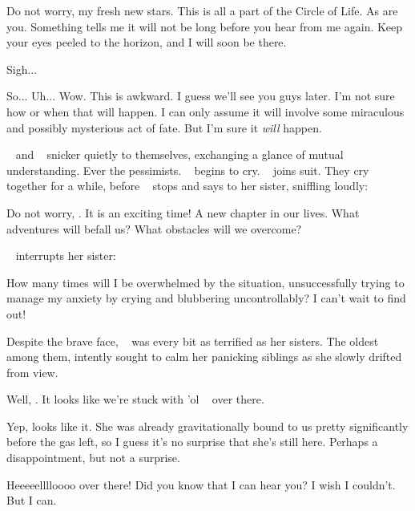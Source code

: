 \documentclass[main.tex]{subfiles}
\begin{document}
\par \Maia Do not worry, my fresh new stars. This is all a part of the Circle of Life.  As are you.  Something tells me it will not be long before you hear from me again. Keep your eyes peeled to the horizon, and I will soon be there.  

\par \Electra Sigh...  

\par \Taygete So... Uh... Wow.  This is awkward.  I guess we'll see you guys later.  I'm not sure how or when that will happen.  I can only assume it will involve some miraculous and possibly mysterious act of fate.  But I'm sure it \textit{will} happen.
  
\par \nar \rmtaygete~ and \rmalcyone~ snicker quietly to themselves, exchanging a glance of mutual understanding.  Ever the pessimists.  \rmelectra~ begins to cry.  \rmsterope~ joins suit.  They cry together for a while, before \rmsterope~ stops and says to her sister, sniffling loudly:

\par \Sterope Do not worry, \rmelectra.  It is an exciting time!  A new chapter in our lives.  What adventures will befall us?  What obstacles will we overcome?  

\par \nar \rmelectra~ interrupts her sister:

\par \Electra How many times will I be overwhelmed by the situation, unsuccessfully trying to manage my anxiety by crying and blubbering uncontrollably? I can't wait to find out!

\par \nar Despite the brave face, \rmmaia~ was every bit as terrified as her sisters.  The oldest among them, \rmmaia intently sought to calm her panicking siblings as she slowly drifted from view.

\par \Taygete Well, \rmalcyone.  It looks like we're stuck with 'ol \rmcelaeno~ over there.

\par \Alcyone Yep, looks like it.  She was already gravitationally bound to us pretty significantly before the gas left, so I guess it's no surprise that she's still here.  Perhaps a disappointment, but not a surprise.

\par \Celaeno Heeeeelllloooo over there!  Did you know that I can hear you?  I wish I couldn't.  But I can.  
\end{document}
